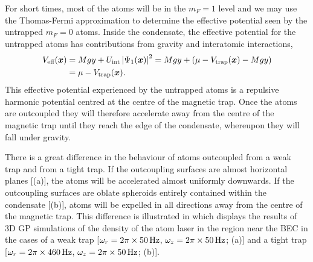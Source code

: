 For short times, most of the atoms will be in the $m_F=1$ level and we may use the Thomas-Fermi approximation to determine the effective potential seen by the untrapped $m_F=0$ atoms.  Inside the condensate, the effective potential for the untrapped atoms has contributions from gravity and interatomic interactions,
\begin{align}
    V_\text{eff}(\bm{x}) &= M g y + U_\text{int} \left|\Psi_1(\bm{x})\right|^2 = M g y + \left(\mu - V_\text{trap}(\bm{x}) - M g y \right) \notag\\
    &= \mu - V_\text{trap}(\bm{x}).
\end{align}
This effective potential experienced by the untrapped atoms is a repulsive harmonic potential centred at the centre of the magnetic trap.  Once the atoms are outcoupled they will therefore accelerate away from the centre of the magnetic trap until they reach the edge of the condensate, whereupon they will fall under gravity.

There is a great difference in the behaviour of atoms outcoupled from a weak trap and from a tight trap.  If the outcoupling surfaces are almost horizontal planes [(a)], the atoms will be accelerated almost uniformly downwards.  If the outcoupling surfaces are oblate spheroids entirely contained within the condensate [(b)], atoms will be expelled in all directions away from the centre of the magnetic trap.  This difference is illustrated in  which displays the results of 3D GP simulations of the density of the atom laser in the region near the BEC in the cases of a weak trap [$\omega_r = 2\pi \times \unit[50]{Hz}$, $\omega_z = 2\pi \times\unit[50]{Hz}$; (a)] and a tight trap [$\omega_r = 2 \pi \times \unit[460]{Hz}$, $\omega_z = 2\pi \times \unit[50]{Hz}$; (b)].  

